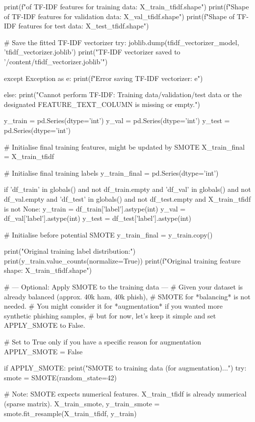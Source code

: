 \begin{ffcode}
    print(f"\nShape of TF-IDF features for training data: {X_train_tfidf.shape}")
    print(f"Shape of TF-IDF features for validation data: {X_val_tfidf.shape}")
    print(f"Shape of TF-IDF features for test data: {X_test_tfidf.shape}")

    # Save the fitted TF-IDF vectorizer
    try:
        joblib.dump(tfidf_vectorizer_model, 'tfidf_vectorizer.joblib')
        print("TF-IDF vectorizer saved to '/content/tfidf_vectorizer.joblib'")

    except Exception as e:
        print(f"Error saving TF-IDF vectorizer: {e}")

else:
    print("Cannot perform TF-IDF: Training data/validation/test data or the designated FEATURE_TEXT_COLUMN is missing or empty.")

y_train = pd.Series(dtype='int')
y_val = pd.Series(dtype='int')
y_test = pd.Series(dtype='int')

# Initialise final training features, might be updated by SMOTE
X_train_final = X_train_tfidf

# Initialise final training labels
y_train_final = pd.Series(dtype='int')

if 'df_train' in globals() and not df_train.empty and 'df_val' in globals() and not df_val.empty and 'df_test' in globals() and not df_test.empty and X_train_tfidf is not None:
    y_train = df_train['label'].astype(int)
    y_val = df_val['label'].astype(int)
    y_test = df_test['label'].astype(int)

    # Initialise before potential SMOTE
    y_train_final = y_train.copy()

    print("Original training label distribution:")
    print(y_train.value_counts(normalize=True))
    print(f"Original training feature shape: {X_train_tfidf.shape}")

    # --- Optional: Apply SMOTE to the training data ---
    # Given your dataset is already balanced (approx. 40k ham, 40k phish),
    # SMOTE for *balancing* is not needed.
    # You might consider it for *augmentation* if you wanted more synthetic phishing samples,
    # but for now, let's keep it simple and set APPLY_SMOTE to False.

    # Set to True only if you have a specific reason for augmentation
    APPLY_SMOTE = False

    if APPLY_SMOTE:
        print("\nApplying SMOTE to training data (for augmentation)...")
        try:
            smote = SMOTE(random_state=42)

            # Note: SMOTE expects numerical features. X_train_tfidf is already numerical (sparse matrix).
            X_train_smote, y_train_smote = smote.fit_resample(X_train_tfidf, y_train)


\end{ffcode}

